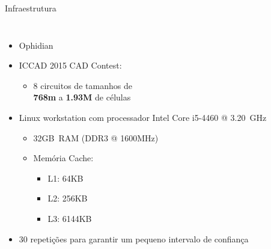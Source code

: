 \begin{frame}{Infraestrutura}
     \begin{columns}
        
            \begin{itemize}
                \item Ophidian
                \item ICCAD 2015 CAD Contest: 
                \begin{itemize}
                    \item 8 circuitos de tamanhos de \\ \textbf{768m} a \textbf{1.93M} de células
                \end{itemize}
                \item Linux workstation com processador Intel\textsuperscript{\textregistered} Core\textsuperscript{\textregistered} i5-4460 @ 3.20~GHz
                \begin{itemize}
                    \item 32GB~RAM (DDR3 @ 1600MHz)
                    \item Memória Cache:
                        \begin{itemize}
                            \item L1: 64KB
                            \item L2: 256KB
                            \item L3: 6144KB
                        \end{itemize}
                \end{itemize}
                \item 30 repetições para garantir um pequeno intervalo de confiança
            \end{itemize}
            
            \begin{center}
            \end{center}
    \end{columns}
\end{frame}

